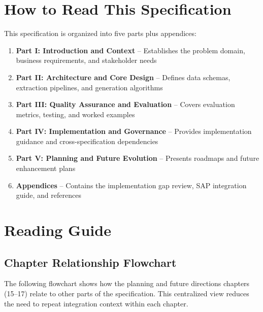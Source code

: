 \documentclass[12pt,a4paper,twoside]{report}
\begin{document}
\section*{How to Read This Specification}

This specification is organized into five parts plus appendices:

\begin{enumerate}
\item \textbf{Part I: Introduction and Context} -- Establishes the problem domain, business requirements, and stakeholder needs
\item \textbf{Part II: Architecture and Core Design} -- Defines data schemas, extraction pipelines, and generation algorithms
\item \textbf{Part III: Quality Assurance and Evaluation} -- Covers evaluation metrics, testing, and worked examples
\item \textbf{Part IV: Implementation and Governance} -- Provides implementation guidance and cross-specification dependencies
\item \textbf{Part V: Planning and Future Evolution} -- Presents roadmaps and future enhancement plans
\item \textbf{Appendices} -- Contains the implementation gap review, SAP integration guide, and references
\end{enumerate}

\section*{Reading Guide}

\subsection*{Chapter Relationship Flowchart}

The following flowchart shows how the planning and future directions chapters (15--17) relate to other parts of the specification. This centralized view reduces the need to repeat integration context within each chapter.
\end{document}
